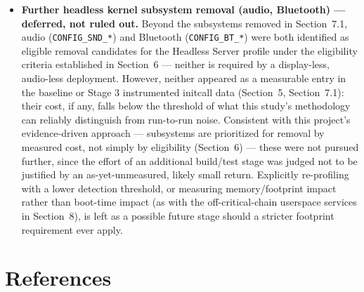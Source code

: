 \documentclass[11pt,a4paper]{article}
\begin{document}
\begin{itemize}
    \item \textbf{Further headless kernel subsystem removal (audio, Bluetooth) — deferred, not ruled out.} Beyond the subsystems removed in Section~7.1, audio (\texttt{CONFIG\_SND\_*}) and Bluetooth (\texttt{CONFIG\_BT\_*}) were both identified as eligible removal candidates for the Headless Server profile under the eligibility criteria established in Section~6 — neither is required by a display-less, audio-less deployment. However, neither appeared as a measurable entry in the baseline or Stage 3 instrumented initcall data (Section~5, Section~7.1): their cost, if any, falls below the threshold of what this study's methodology can reliably distinguish from run-to-run noise. Consistent with this project's evidence-driven approach — subsystems are prioritized for removal by measured cost, not simply by eligibility (Section~6) — these were not pursued further, since the effort of an additional build/test stage was judged not to be justified by an as-yet-unmeasured, likely small return. Explicitly re-profiling with a lower detection threshold, or measuring memory/footprint impact rather than boot-time impact (as with the off-critical-chain userspace services in Section~8), is left as a possible future stage should a stricter footprint requirement ever apply.
\end{itemize}

\section{References}
\end{document}
